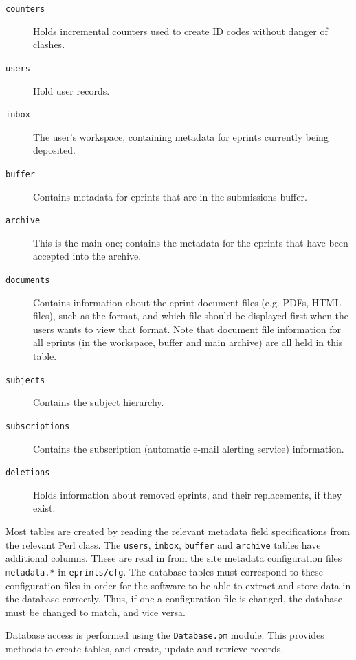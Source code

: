 \begin{description}
\item[{\tt counters}]
Holds incremental counters used to create ID codes without danger of clashes.

\item[{\tt users}]
Hold user records.

\item[{\tt inbox}]
The user's workspace, containing metadata for eprints currently being deposited.

\item[{\tt buffer}]
Contains metadata for eprints that are in the submissions buffer.

\item[{\tt archive}]
This is the main one; contains the metadata for the eprints that have been accepted into the archive.

\item[{\tt documents}]
Contains information about the eprint document files (e.g. PDFs, HTML files), such as the format, and which file should be displayed first when the users wants to view that format. Note that document file information for all eprints (in the workspace, buffer and main archive) are all held in this table.

\item[{\tt subjects}]
Contains the subject hierarchy.

\item[{\tt subscriptions}]
Contains the subscription (automatic e-mail alerting service) information.

\item[{\tt deletions}]
Holds information about removed eprints, and their replacements, if they exist.
\end{description}

Most tables are created by reading the relevant metadata field specifications from the relevant Perl class. The {\tt users}, {\tt inbox}, {\tt buffer} and {\tt archive} tables have additional columns. These are read in from the site metadata configuration files {\tt metadata.*} in {\tt eprints/cfg}. The database tables must correspond to these configuration files in order for the software to be able to extract and store data in the database correctly. Thus, if one a configuration file is changed, the database must be changed to match, and vice versa.

Database access is performed using the {\tt Database.pm} module. This provides methods to create tables, and create, update and retrieve records.


